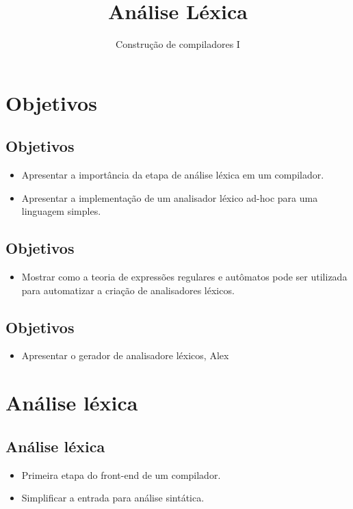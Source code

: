 \documentclass[11pt]{article}
\author{Construção de compiladores I}
\date{}
\title{Análise Léxica}
\begin{document}
\maketitle
\section*{Objetivos}
\label{sec:org148f440}

\subsection*{Objetivos}
\label{sec:org36b3f89}

\begin{itemize}
\item Apresentar a importância da etapa de análise léxica
em um compilador.
\item Apresentar a implementação de um analisador léxico ad-hoc
para uma linguagem simples.
\end{itemize}
\subsection*{Objetivos}
\label{sec:org35b4d25}

\begin{itemize}
\item Mostrar como a teoria de expressões regulares e autômatos pode ser utilizada para automatizar a criação de analisadores léxicos.
\end{itemize}
\subsection*{Objetivos}
\label{sec:orge444581}

\begin{itemize}
\item Apresentar o gerador de analisadore léxicos, Alex
\end{itemize}
\section*{Análise léxica}
\label{sec:org2b127f2}

\subsection*{Análise léxica}
\label{sec:orgd403b79}

\begin{itemize}
\item Primeira etapa do front-end de um compilador.
\item Simplificar a entrada para análise sintática.
\end{itemize}
\end{document}
